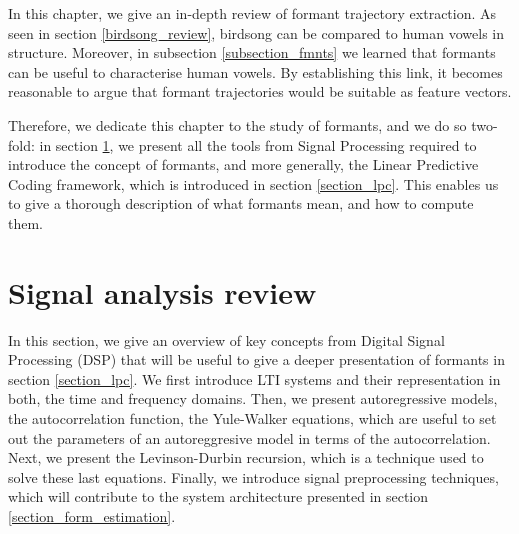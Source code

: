 \documentclass[../main.tex]{subfiles}
\begin{document}
 \label{chapter_formants}
\par In this chapter, we give an in-depth review of formant trajectory extraction. As seen in section \ref{birdsong_review}, birdsong can be compared to human vowels in structure. Moreover, in subsection \ref{subsection_fmnts} we learned that formants can be useful to characterise human vowels. By establishing this link, it becomes reasonable to argue that formant trajectories would be suitable as feature vectors. 
\par Therefore, we dedicate this chapter to the study of formants, and we do so two-fold: in section \ref{section_dsp}, we present all the tools from Signal Processing required to introduce the concept of formants, and more generally, the Linear Predictive Coding framework, which is introduced in section \ref{section_lpc}. This enables us to give a thorough description of what formants mean, and how to compute them.

\section{Signal analysis review} \label{section_dsp}
In this section, we give an overview of key concepts from Digital Signal Processing (DSP) that will be useful to give a deeper presentation of formants in section \ref{section_lpc}. We first introduce LTI systems and their representation in both, the time and frequency domains. Then, we present autoregressive models, the autocorrelation function, the Yule-Walker equations, which are useful to set out the parameters of an autoreggresive model in terms of the autocorrelation. Next, we present the Levinson-Durbin recursion, which is a technique used to solve these last equations. Finally, we introduce signal preprocessing techniques, which will contribute to the system architecture presented in section \ref{section_form_estimation}. 
\end{document}
